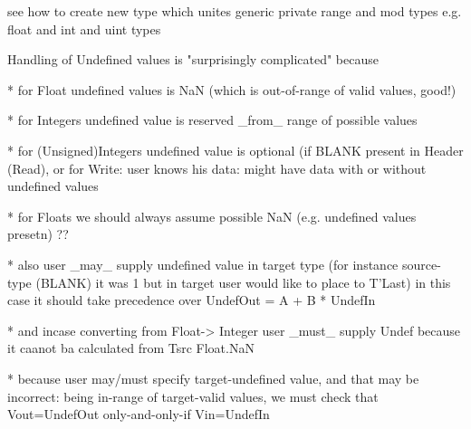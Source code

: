 

see how to create new type which unites generic private range and mod
types e.g. float and int and uint types



Handling of Undefined values is "surprisingly complicated" because

* for Float undefined values is NaN (which is out-of-range of valid values, good!) 

* for Integers undefined value is reserved _from_ range of possible values

* for (Unsigned)Integers undefined value is optional (if BLANK present in Header (Read),
or for Write: user knows his data: might have data with or without undefined values

* for Floats we should always assume possible NaN (e.g. undefined values presetn) ??

* also user _may_ supply undefined value in target type (for instance
source-type (BLANK) it was 1 but in target user would like to place to T'Last)
in this case it should take precedence over UndefOut = A + B * UndefIn

* and incase converting from Float-> Integer user _must_ supply Undef
because it caanot ba calculated from Tsrc Float.NaN

* because user may/must specify target-undefined value, and that may be
incorrect: being in-range of target-valid values, we must check
that Vout=UndefOut only-and-only-if Vin=UndefIn


